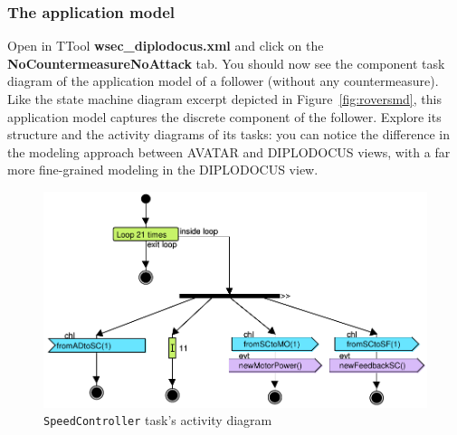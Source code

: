 \documentclass{article}
\begin{document}
\subsubsection{The application model}

Open in TTool \textbf{wsec\_diplodocus.xml} and click on the \textbf{NoCountermeasureNoAttack} tab. You should now see the component task diagram of the application model of a follower (without any countermeasure). Like the state machine diagram excerpt depicted in Figure~\ref{fig:roversmd}, this application model captures the discrete component of the follower. Explore its structure and the activity diagrams of its tasks: you can notice the difference in the modeling approach between AVATAR and DIPLODOCUS views, with a far more fine-grained modeling in the DIPLODOCUS view.

\begin{figure}
	\centering
	\includegraphics[width=.75\textwidth]{figures/execi.pdf}
	\caption{\texttt{SpeedController} task's activity diagram}
	\label{fig:ad}
\end{figure}
\end{document}
